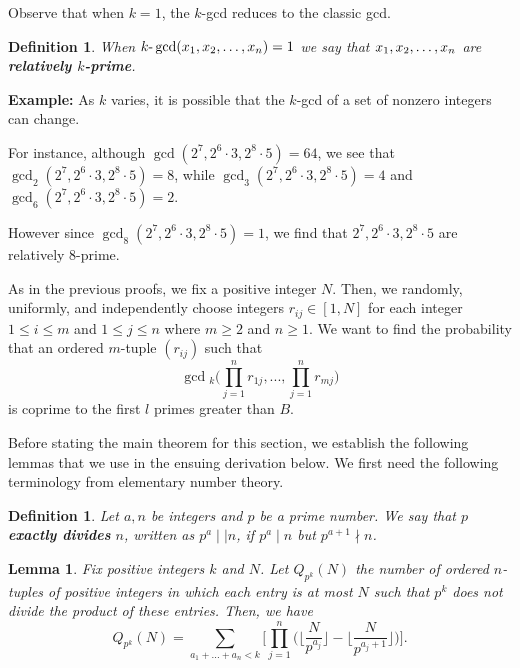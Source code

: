 \documentclass[12pt]{amsart}
\newtheorem{lemma}[theorem]{Lemma}
\newtheorem{definition}[theorem]{Definition}
\theoremstyle{definition}
\begin{document}
\noindent Observe that when $k=1$, the $k$-gcd reduces to the classic gcd.

\begin{definition} When $k\text{-}\gcd(x_1,x_2,\mathellipsis,x_n)=1$ we say that  $x_1,x_2,\mathellipsis,x_n$ are \textbf{relatively $k$-prime}.
\end{definition}

\noindent \textbf{Example:}
As $k$ varies, it is possible that the $k$-gcd of a set of nonzero integers can change. 

\noindent For instance, although $\gcd(2^7, 2^6 \cdot 3, 2^8 \cdot 5) = 64$, we see that $\gcd_2(2^7, 2^6 \cdot 3, 2^8 \cdot 5)=8$, while $\gcd_3(2^7, 2^6 \cdot 3, 2^8 \cdot 5)=4$ and $\gcd_6(2^7, 2^6 \cdot 3, 2^8 \cdot 5) = 2$. 

\noindent However since $\gcd_8(2^7, 2^6 \cdot 3, 2^8 \cdot 5) = 1$, we find that $2^7, 2^6 \cdot 3, 2^8 \cdot 5$ are relatively $8$-prime.

As in the previous proofs, we fix a positive integer $N$. Then, we randomly, uniformly, and independently choose integers $r_{ij} \in [1, N]$ for each integer $1 \leq i \leq m$ and $1 \leq j \leq n$ where $m \geq 2$ and $n \geq 1$. We want to find the probability that an ordered $m$-tuple $(r_{ij})$ such that 
$$\gcd{}_k\Big(\prod_{j=1}^nr_{1j}, ..., \prod_{j=1}^n r_{mj}\Big)$$
is coprime to the first $l$ primes greater than $B$. 

Before stating the main theorem for this section, we establish the following lemmas that we use in the ensuing derivation below. We first need the following terminology from elementary number theory.

\begin{definition}
	Let $a, n$ be integers and $p$ be a prime number. We say that $p$ \textbf{exactly divides} $n$, written as $p^a \mid \mid n$, if $p^a \mid n$ but $p^{a+1} \nmid n$. 
\end{definition}

\begin{lemma}
	Fix positive integers $k$ and $N$. Let $Q_{p^k}(N)$ the number of ordered $n$-tuples of positive integers in which each entry is at most $N$ such that $p^k$ does not divide the product of these entries. Then, we have
	$$Q_{p^k}(N) = \sum_{a_1+...+a_n < k} \Big[\prod_{j=1}^n \Big(\Big\lfloor \frac{N}{p^{a_j}}\Big\rfloor - \Big\lfloor \frac{N}{p^{a_j + 1}}\Big\rfloor\Big)\Big].$$
\end{lemma}
\end{document}
